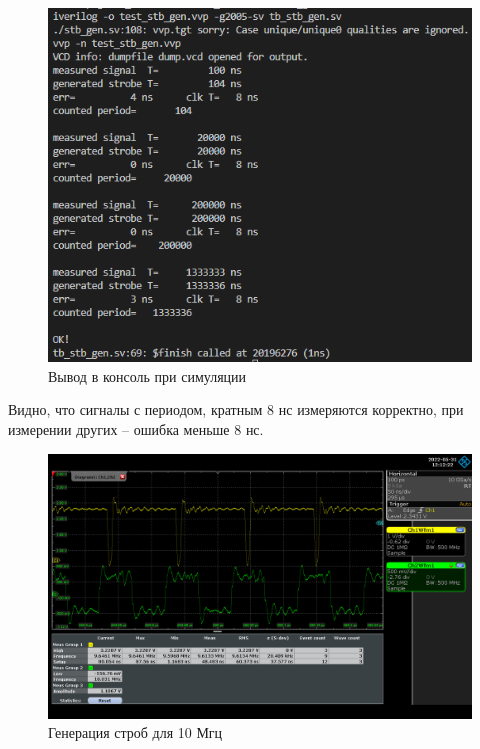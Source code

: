 \begin{figure}[ht!] 
	\center
	\includegraphics  [scale=0.8] {my_folder/images//tb_stb_gen_out}
	\caption{Вывод в консоль при симуляции} 
	\label{fig:tb-stb-gen-out}  
\end{figure}
\FloatBarrier

Видно, что сигналы с периодом, кратным 8 нс измеряются корректно, при измерении других -- ошибка меньше 8 нс.

\begin{figure}[ht!] 
	\center
	\includegraphics  [scale=0.3] {my_folder/images//stb_10mhz}
	\caption{Генерация строб для 10 Мгц} 
	\label{fig:stb-10mhz}  
\end{figure}

